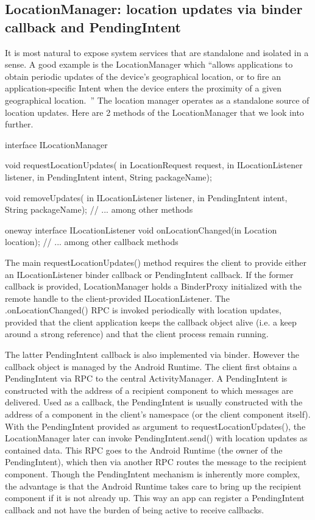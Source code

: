 \documentclass[prodmode]{acmlarge}
\begin{document}
\subsection{LocationManager: location updates via binder callback and PendingIntent}
It is most natural to expose system services that are standalone and isolated in a sense. A good example is the LocationManager which ``allows applications to obtain periodic updates of the device's geographical location, or to fire an application-specific Intent when the device enters the proximity of a given geographical location.~\cite{LocationManagerDocs}'' The location manager operates as a standalone source of location updates. Here are 2 methods of the LocationManager that we look into further.

\begin{snippet}
interface ILocationManager {
  void requestLocationUpdates(
      in LocationRequest request,
      in ILocationListener listener,
      in PendingIntent intent,
      String packageName);

  void removeUpdates(
      in ILocationListener listener,
      in PendingIntent intent,
      String packageName);
  // ... among other methods
}
\end{snippet}

\begin{snippet}
oneway interface ILocationListener {
    void onLocationChanged(in Location location);
    // ... among other callback methods
}
\end{snippet}

The main requestLocationUpdates() method requires the client to provide either an ILocationListener binder callback or PendingIntent callback. If the former callback is provided, LocationManager holds a BinderProxy initialized with the remote handle to the client-provided ILocationListener. The .onLocationChanged() RPC is invoked periodically with location updates, provided that the client application keeps the callback object alive (i.e. a keep around a strong reference) and that the client process remain running.

The latter PendingIntent callback is also implemented via binder. However the callback object is managed by the Android Runtime. The client first obtains a PendingIntent via RPC to the central ActivityManager. A PendingIntent is constructed with the address of a recipient component to which messages are delivered. Used as a callback, the PendingIntent is usually constructed with the address of a component in the client's namespace (or the client component itself). With the PendingIntent provided as argument to requestLocationUpdates(), the LocationManager later can invoke PendingIntent.send() with location updates as contained data. This RPC goes to the Android Runtime (the owner of the PendingIntent), which then via another RPC routes the message to the recipient component. Though the PendingIntent mechanism is inherently more complex, the advantage is that the Android Runtime takes care to bring up the recipient component if it is not already up. This way an app can register a PendingIntent callback and not have the burden of being active to receive callbacks.
\end{document}

